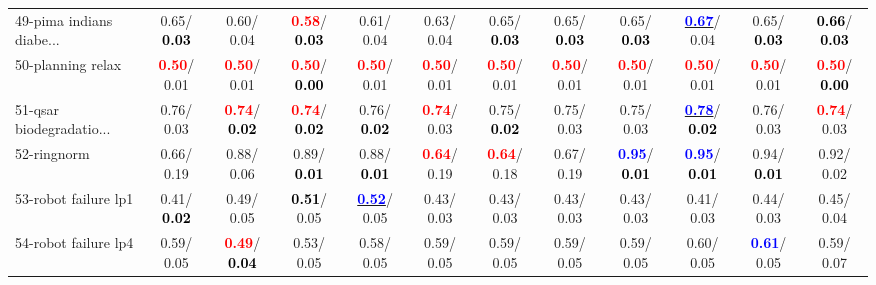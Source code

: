 \begin{table}[h]
\begin{center}
{\begin{tabular}{lc|c|c|c|c|c|c|c|c|c|c}
49-pima indians diabe... &   0.65/\textcolor{black}{\textbf{  0.03}} &   0.60/  0.04 & \textcolor{red}{\textbf{  0.58}}/\textcolor{black}{\textbf{  0.03}} &   0.61/  0.04 &   0.63/  0.04 &   0.65/\textcolor{black}{\textbf{  0.03}} &   0.65/\textcolor{black}{\textbf{  0.03}} &   0.65/\textcolor{black}{\textbf{  0.03}} & \underline{\textcolor{blue}{\textbf{  0.67}}}/  0.04 &   0.65/\textcolor{black}{\textbf{  0.03}} & \textcolor{black}{\textbf{  0.66}}/\textcolor{black}{\textbf{  0.03}} \\
50-planning relax & \textcolor{red}{\textbf{  0.50}}/  0.01 & \textcolor{red}{\textbf{  0.50}}/  0.01 & \textcolor{red}{\textbf{  0.50}}/\textcolor{black}{\textbf{  0.00}} & \textcolor{red}{\textbf{  0.50}}/  0.01 & \textcolor{red}{\textbf{  0.50}}/  0.01 & \textcolor{red}{\textbf{  0.50}}/  0.01 & \textcolor{red}{\textbf{  0.50}}/  0.01 & \textcolor{red}{\textbf{  0.50}}/  0.01 & \textcolor{red}{\textbf{  0.50}}/  0.01 & \textcolor{red}{\textbf{  0.50}}/  0.01 & \textcolor{red}{\textbf{  0.50}}/\textcolor{black}{\textbf{  0.00}} \\
51-qsar biodegradatio... &   0.76/  0.03 & \textcolor{red}{\textbf{  0.74}}/\textcolor{black}{\textbf{  0.02}} & \textcolor{red}{\textbf{  0.74}}/\textcolor{black}{\textbf{  0.02}} &   0.76/\textcolor{black}{\textbf{  0.02}} & \textcolor{red}{\textbf{  0.74}}/  0.03 &   0.75/\textcolor{black}{\textbf{  0.02}} &   0.75/  0.03 &   0.75/  0.03 & \underline{\textcolor{blue}{\textbf{  0.78}}}/\textcolor{black}{\textbf{  0.02}} &   0.76/  0.03 & \textcolor{red}{\textbf{  0.74}}/  0.03 \\
52-ringnorm &   0.66/  0.19 &   0.88/  0.06 &   0.89/\textcolor{black}{\textbf{  0.01}} &   0.88/\textcolor{black}{\textbf{  0.01}} & \textcolor{red}{\textbf{  0.64}}/  0.19 & \textcolor{red}{\textbf{  0.64}}/  0.18 &   0.67/  0.19 & \textcolor{blue}{\textbf{  0.95}}/\textcolor{black}{\textbf{  0.01}} & \textcolor{blue}{\textbf{  0.95}}/\textcolor{black}{\textbf{  0.01}} &   0.94/\textcolor{black}{\textbf{  0.01}} &   0.92/  0.02 \\
53-robot failure lp1 &   0.41/\textcolor{black}{\textbf{  0.02}} &   0.49/  0.05 & \textcolor{black}{\textbf{  0.51}}/  0.05 & \underline{\textcolor{blue}{\textbf{  0.52}}}/  0.05 &   0.43/  0.03 &   0.43/  0.03 &   0.43/  0.03 &   0.43/  0.03 &   0.41/  0.03 &   0.44/  0.03 &   0.45/  0.04 \\ \hline
54-robot failure lp4 &   0.59/  0.05 & \textcolor{red}{\textbf{  0.49}}/\textcolor{black}{\textbf{  0.04}} &   0.53/  0.05 &   0.58/  0.05 &   0.59/  0.05 &   0.59/  0.05 &   0.59/  0.05 &   0.59/  0.05 &   0.60/  0.05 & \textcolor{blue}{\textbf{  0.61}}/  0.05 &   0.59/  0.07 \\

\end{tabular}}
\end{center}
\end{table}
